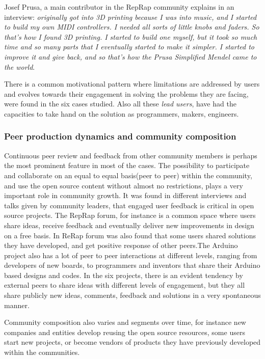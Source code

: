 \documentclass{ICED-Paper}%
\begin{document}
Josef Prusa, a main contributor in the RepRap community explains in an interview: \emph{originally got into 3D printing because I was into music, and I started to build my own MIDI controllers. I needed all sorts of little knobs and faders. So that’s how I found 3D printing. I started to build one myself, but it took so much time and so many parts that I eventually started to make it simpler. I started to improve it and give back, and so that’s how the Prusa Simplified Mendel came to the world}.
\bigskip

There is a common motivational pattern where limitations are addressed by users and evolves towards their engagement in solving the problems they are facing, were found in the six cases studied. Also all these \emph{lead users}, have had the capacities to take hand on the solution as programmers, makers, engineers.

\subsubsection{Peer production dynamics and community composition}
Continuous peer review and feedback from other community members is perhaps the most prominent feature in most of the cases. The possibility to participate and collaborate on an equal to equal basis(peer to peer) within the community, and use the open source content without almost no restrictions, plays a very important role in community growth. It was found in different interviews and talks given by community leaders, that engaged user feedback is critical in open source projects. The RepRap forum, for instance is a common space where users share ideas, receive feedback and eventually deliver new improvements in design on a free basis. In ReRap forum was also found that some users shared solutions they have developed, and get positive response of other peers.The Arduino project also has a lot of peer to peer interactions at different levels, ranging from developers of new boards, to programmers and inventors that share their Arduino based designs and codes. In the six projects, there is an evident tendency by external peers to share ideas with different levels of engagement, but they all share publicly new ideas, comments, feedback and solutions in a very spontaneous manner.
\bigskip

Community composition also varies and segments over time, for instance new companies and entities develop reusing the open source resources, some users start new projects, or become vendors of products they have previously developed within the communities.
\end{document}
